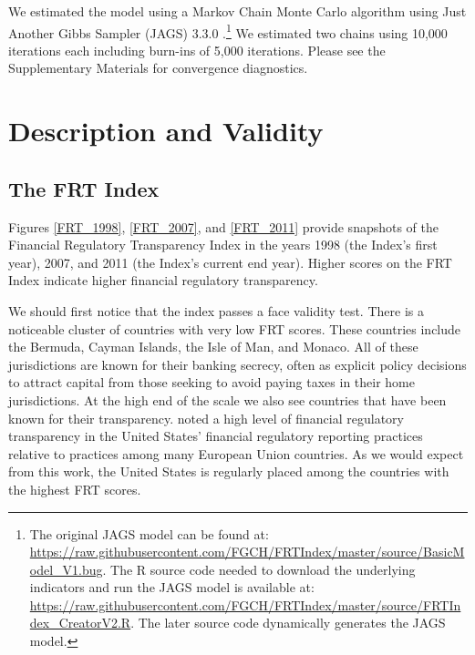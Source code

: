 \documentclass[a4paper]{article}
\begin{document}
We estimated the model using a Markov Chain Monte Carlo algorithm using Just Another Gibbs Sampler (JAGS) 3.3.0 \citep{Plummer2003}.\footnote{The original JAGS model can be found at: \url{https://raw.githubusercontent.com/FGCH/FRTIndex/master/source/BasicModel_V1.bug}. The R \citep{RCite} source code needed to download the underlying indicators and run the JAGS model is available at: \url{https://raw.githubusercontent.com/FGCH/FRTIndex/master/source/FRTIndex_CreatorV2.R}. The later source code dynamically generates the JAGS model.} We estimated two chains using 10,000 iterations each including burn-ins of 5,000 iterations. Please see the Supplementary Materials for convergence diagnostics. 


\section{Description and Validity}


\subsection{The FRT Index}

Figures \ref{FRT_1998}, \ref{FRT_2007}, and \ref{FRT_2011} provide snapshots of the Financial Regulatory Transparency Index in the years 1998 (the Index's first year), 2007, and 2011 (the Index's current end year). Higher scores on the FRT Index indicate higher financial regulatory transparency.

We should first notice that the index passes a face validity test. There is a noticeable cluster of countries with very low FRT scores. These countries include the Bermuda, Cayman Islands, the Isle of Man, and Monaco. All of these jurisdictions are known for their banking secrecy, often as explicit policy decisions to attract capital from those seeking to avoid paying taxes in their home jurisdictions. At the high end of the scale we also see countries that have been known for their transparency. \cite{Gandrud2014a} noted a high level of financial regulatory transparency in the United States' financial regulatory reporting practices relative to practices among many European Union countries. As we would expect from this work, the United States is regularly placed among the countries with the highest FRT scores.  
\end{document}
